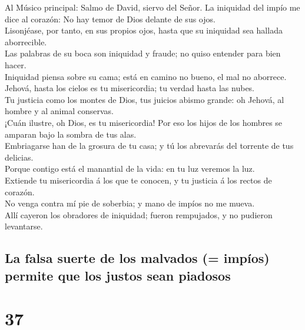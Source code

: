  Al Músico principal: Salmo de David, siervo del Señor. La
iniquidad del impío me dice al corazón: No hay temor de Dios delante de
sus ojos.\\
 Lisonjéase, por tanto, en sus propios ojos, hasta que su
iniquidad sea hallada aborrecible.\\
 Las palabras de su boca son iniquidad y fraude; no quiso
entender para bien hacer.\\
 Iniquidad piensa sobre su cama; está en camino no bueno,
el mal no aborrece.\\
 Jehová, hasta los cielos es tu misericordia; tu verdad
hasta las nubes.\\
 Tu justicia como los montes de Dios, tus juicios abismo
grande: oh Jehová, al hombre y al animal conservas.\\
 ¡Cuán ilustre, oh Dios, es tu misericordia! Por eso los
hijos de los hombres se amparan bajo la sombra de tus alas.\\
 Embriagarse han de la grosura de tu casa; y tú los
abrevarás del torrente de tus delicias.\\
 Porque contigo está el manantial de la vida: en tu luz
veremos la luz.\\
 Extiende tu misericordia á los que te conocen, y tu
justicia á los rectos de corazón.\\
 No venga contra mí pie de soberbia; y mano de impíos no
me mueva.\\
 Allí cayeron los obradores de iniquidad; fueron
rempujados, y no pudieron levantarse.

\hypertarget{la-falsa-suerte-de-los-malvados-impuxedos-permite-que-los-justos-sean-piadosos}{%
\subsection{La falsa suerte de los malvados (= impíos) permite que los
justos sean
piadosos}\label{la-falsa-suerte-de-los-malvados-impuxedos-permite-que-los-justos-sean-piadosos}}

\hypertarget{section-36}{%
\section{37}\label{section-36}}

